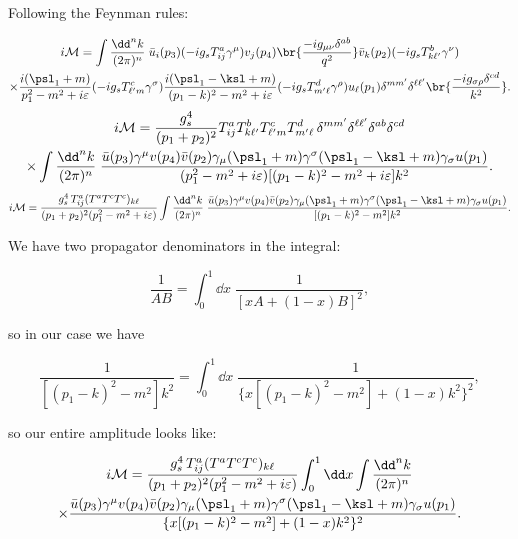 Following the Feynman rules:

\begin{multline}
  i\mathcal{M} = \int \frac{\dd^nk}{(2\pi)^n} \; \bar{u}_i(p_3) (-ig_s T^a_{ij}\gamma^\mu) v_j(p_4) \br{\frac{-ig_{\mu\nu}\delta^{ab}}{q^2}} \bar{v}_k(p_2) (-ig_s T^b_{k\ell'}\gamma^\nu) \\
  \times \frac{i(\psl_1 + m)}{p_1^2 - m^2 + i\varepsilon} (-ig_s T^c_{\ell'm} \gamma^\sigma) \frac{i(\psl_1 - \ksl + m)}{(p_1 - k)^2 - m^2 + i\varepsilon} (-ig_s T^d_{m'\ell}\gamma^\rho) u_{\ell}(p_1) \delta^{mm'}\delta^{\ell\ell'} \br{\frac{-ig_{\sigma\rho}\delta^{cd}}{k^2}}.
\end{multline}
\begin{multline}
  i\mathcal{M} = \frac{g_s^4}{(p_1+p_2)^2} T^a_{ij}T^b_{k\ell'}T^c_{\ell'm}T^d_{m'\ell} \, \delta^{mm'}\delta^{\ell\ell'}\delta^{ab}\delta^{cd} \\
  \times \int \frac{\dd^nk}{(2\pi)^n} \; \frac{\bar{u}(p_3) \gamma^\mu v(p_4) \bar{v}(p_2) \gamma_\mu (\psl_1 + m) \gamma^\sigma (\psl_1 - \ksl + m) \gamma_\sigma u(p_1)}{(p_1^2 - m^2 + i\varepsilon)[(p_1 - k)^2 - m^2 + i\varepsilon]k^2}.
\end{multline}
\begin{multline}
  i\mathcal{M} = \frac{g_s^4 \, T^a_{ij} (T^aT^cT^c)_{k\ell}}{(p_1 + p_2)^2(p_1^2 - m^2 + i\varepsilon)} \int \frac{\dd^nk}{(2\pi)^n} \; \frac{\bar{u}(p_3) \gamma^\mu v(p_4) \bar{v}(p_2) \gamma_\mu (\psl_1 + m) \gamma^\sigma (\psl_1 - \ksl + m) \gamma_\sigma u(p_1)}{[(p_1 - k)^2 - m^2]k^2}.
\end{multline}

We have two propagator denominators in the integral:

\begin{equation}
  \frac{1}{AB} = \int_0^1 \dd x \; \frac{1}{[xA + (1-x)B]^2},
\end{equation}

so in our case we have

\begin{equation}
  \frac{1}{[(p_1 - k)^2 - m^2]k^2} = \int_0^1 \dd x \; \frac{1}{\{ x[(p_1 - k)^2 - m^2] + (1-x)k^2 \}^2},
\end{equation}

so our entire amplitude looks like:

\begin{multline}
  i\mathcal{M} = \frac{g_s^4 \, T^a_{ij} (T^aT^cT^c)_{k\ell}}{(p_1 + p_2)^2(p_1^2 - m^2 + i\varepsilon)} \int_0^1 \dd x \int \frac{\dd^nk}{(2\pi)^n} \\
  \times \frac{\bar{u}(p_3) \gamma^\mu v(p_4) \bar{v}(p_2) \gamma_\mu (\psl_1 + m) \gamma^\sigma (\psl_1 - \ksl + m) \gamma_\sigma u(p_1)}{\{ x[(p_1 - k)^2 - m^2] + (1-x)k^2 \}^2}.
\end{multline}





